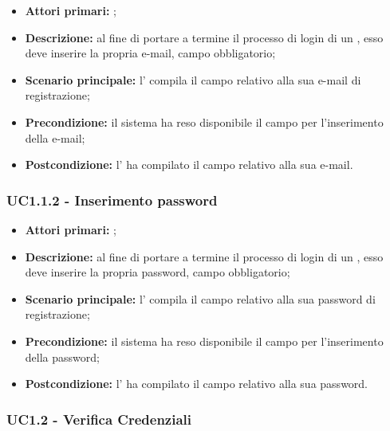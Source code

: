 \documentclass[casi-duso]{subfiles}
\begin{document}
\begin{itemize}
  \item \textbf{Attori primari:} ;
  \item \textbf{Descrizione:} al fine di portare a termine il processo di login di un , esso deve inserire la propria e-mail, campo obbligatorio;
  \item \textbf{Scenario principale:} l' compila il campo relativo alla sua e-mail di registrazione;
  \item \textbf{Precondizione:} il sistema ha reso disponibile il campo per l'inserimento della e-mail;
  \item \textbf{Postcondizione:} l' ha compilato il campo relativo alla sua e-mail.
\end{itemize}

\subsubsection{UC1.1.2 - Inserimento password}
\label{subsub:UC1.1.2}

\begin{itemize}
  \item \textbf{Attori primari:} ;
  \item \textbf{Descrizione:} al fine di portare a termine il processo di login di un , esso deve inserire la propria password, campo obbligatorio;
  \item \textbf{Scenario principale:} l' compila il campo relativo alla sua password di registrazione;
  \item \textbf{Precondizione:} il sistema ha reso disponibile il campo per l'inserimento della password;
  \item \textbf{Postcondizione:} l' ha compilato il campo relativo alla sua password.
\end{itemize}


\subsubsection{UC1.2 - Verifica Credenziali}
\label{subsub:UC1.2}
\end{document}
